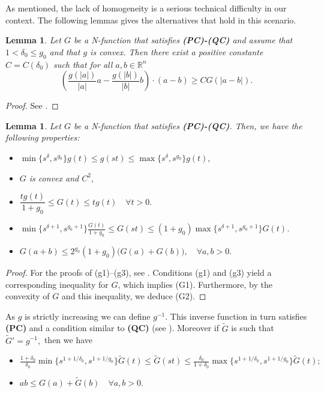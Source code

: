 \documentclass[11pt, leqno]{article}
\newtheorem{lemma}[theorem]{Lemma}
\theoremstyle{definition}
\theoremstyle{remark}
\numberwithin{equation}{section}
\begin{document}
As mentioned, the lack of homogeneity is a serious technical difficulty in
our context. The following lemmas gives the alternatives that hold in this scenario.
\begin{lemma}\label{lemm1}
    Let $G$ be a N-function that satisfies {\bf (PC)-(QC)} and assume that $1<\delta_0\leq g_0$ and that $g$ is convex. Then there exist a positive constante $C=C(\delta_0)$ such that for all $a, b\in \mathbb{R}^n$
    $$\left( \frac{g(|a|)}{|a|}a- \frac{g(|b|)}{|b|}b\right)\cdot(a-b)\geq CG(|a-b|).  $$
\end{lemma}
\begin{proof}
    See \cite[Lemma 3.1]{Cant}.
\end{proof}

\begin{lemma}
Let $G$ be a N-function that satisfies {\bf (PC)-(QC)}. Then, we have the following properties:

\begin{itemize}
\item[(g1)] $\min\{s^\delta, s^{g_0}\}g(t) \leq g(st) \leq \max\{s^\delta, s^{g_0}\}g(t),$
\item[(g2)] $G$ is convex and $C^2,$
\item[(g3)] $\dfrac{t g(t)}{1 + g_0} \leq G(t) \leq t g(t) \quad \forall t > 0.$
\item[(G1)] $\min\{s^{\delta+1}, s^{g_0+1}\} \frac{G(t)}{1 + g_0} \leq G(st) \leq (1 + g_0)\max\{s^{\delta+1}, s^{g_0+1}\}G(t)$.
\item[(G2)] $G(a + b) \leq 2^{g_0}(1 + g_0)\big(G(a) + G(b)\big), \quad \forall a,b > 0.$
\end{itemize}
\end{lemma}

\begin{proof}
For the proofs of (g1)--(g3), see \cite{Lieb}. Conditions (g1) and (g3) yield a corresponding inequality for $G$, which implies (G1). Furthermore, by the convexity of $G$ and this inequality, we deduce (G2).
\end{proof}

As $g$ is strictly increasing we can define $g^{-1}$. This inverse function in turn satisfies {\bf (PC)} and a condition similar to {\bf (QC)} (see \cite[Lemma  2.2]{MarWol08}). Moreover if $\tilde{G}$ is such that $\tilde{G}'=g^{-1},$ then we have
\begin{itemize}
    \item[$(\tilde{G}1)$] $\frac{1+\delta_0}{\delta_0}\min\{s^{1+1/\delta_0}, s^{1+1/g_0}\}\tilde{G}(t) \leq \tilde{G}(st)\leq \frac{\delta_0}{1+\delta_0}\max\{s^{1+1/\delta_0}, s^{1+1/g_0}\}\tilde{G}(t);$ 
    \item[$(\tilde{g}1)$] $ab \leq G(a) + \tilde{G}(b)\quad \forall a,b>0.$
\end{itemize}
\end{document}
